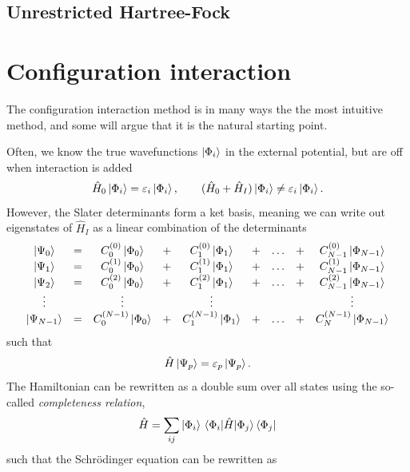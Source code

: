 \subsection{Unrestricted Hartree-Fock}

\section{Configuration interaction} \label{sec:ci}
The configuration interaction method is in many ways the the most intuitive method, and some will argue that it is the natural starting point. 

Often, we know the true wavefunctions $\ket{\Phi_i}$ in the external potential, but are off when interaction is added
\begin{equation}
\hat{H}_0\ket{\Phi_i}=\varepsilon_i\ket{\Phi_i},\qquad (\hat{H}_0+\hat{H}_I)\ket{\Phi_i}\neq\varepsilon_i\ket{\Phi_i}.
\end{equation}
However, the Slater determinants form a ket basis, meaning we can write out eigenstates of $\hat{H}_I$ as a linear combination of the determinants
\begin{equation}
\mqty{
	\ket{\Psi_0}&=&C_0^{(0)}\ket{\Phi_0}&+&C_1^{(0)}\ket{\Phi_1}&+&\hdots&+&C_{N-1}^{(0)}\ket{\Phi_{N-1}}\\
	\ket{\Psi_1}&=&C_0^{(1)}\ket{\Phi_0}&+&C_1^{(1)}\ket{\Phi_1}&+&\hdots&+&C_{N-1}^{(1)}\ket{\Phi_{N-1}}\\
	\ket{\Psi_2}&=&C_0^{(2)}\ket{\Phi_0}&+&C_1^{(2)}\ket{\Phi_1}&+&\hdots&+&C_{N-1}^{(2)}\ket{\Phi_{N-1}}\\
	\vdots&&\vdots&&\vdots&&&&\vdots\\
	\ket{\Psi_{N-1}}&=&C_0^{(N-1)}\ket{\Phi_0}&+&C_1^{(N-1)}\ket{\Phi_1}&+&\hdots&+&C_N^{(N-1)}\ket{\Phi_{N-1}}
}
\end{equation}
such that 
\begin{equation}
\hat{H}\ket{\Psi_p}=\varepsilon_p\ket{\Psi_p}.
\end{equation}
The Hamiltonian can be rewritten as a double sum over all states using the so-called \textit{completeness relation}, 
\begin{equation}
\hat{H}=\sum_{ij}\ket{\Phi_i}\mel{\Phi_i}{\hat{H}}{\Phi_j}\bra{\Phi_j}
\end{equation}
such that the Schr\"odinger equation can be rewritten as
